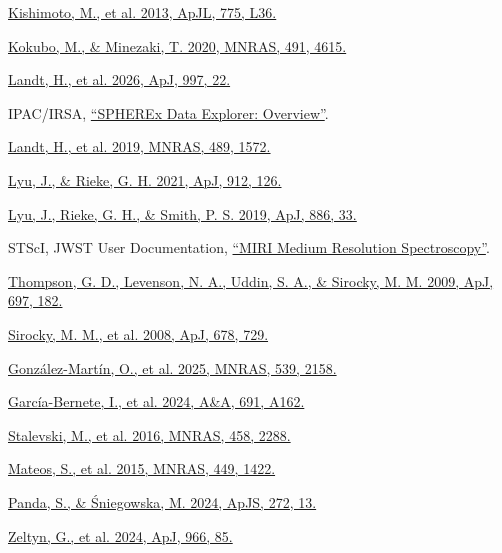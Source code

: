 \documentclass[12pt]{article}
\begin{document}
\noindent [18] \href{https://arxiv.org/abs/1308.6517}{Kishimoto, M., et al. 2013, ApJL, 775, L36.}\par
\noindent [19] \href{https://academic.oup.com/mnras/article/491/4/4615/5652205}{Kokubo, M., \& Minezaki, T. 2020, MNRAS, 491, 4615.}\par
\noindent [20] \href{https://arxiv.org/abs/2510.21395}{Landt, H., et al. 2026, ApJ, 997, 22.}\par
\noindent [21] IPAC/IRSA, \href{https://irsa.ipac.caltech.edu/onlinehelp/spherex/spherex/overview.html}{``SPHEREx Data Explorer: Overview''}.\par
\noindent [22] \href{https://arxiv.org/abs/1908.01627}{Landt, H., et al. 2019, MNRAS, 489, 1572.}\par
\noindent [23] \href{https://doi.org/10.3847/1538-4357/abee14}{Lyu, J., \& Rieke, G. H. 2021, ApJ, 912, 126.}\par
\noindent [24] \href{https://doi.org/10.3847/1538-4357/ab481d}{Lyu, J., Rieke, G. H., \& Smith, P. S. 2019, ApJ, 886, 33.}\par
\noindent [25] STScI, JWST User Documentation, \href{https://jwst-docs.stsci.edu/jwst-mid-infrared-instrument/miri-observing-modes/miri-medium-resolution-spectroscopy}{``MIRI Medium Resolution Spectroscopy''}.\par
\noindent [26] \href{https://doi.org/10.1088/0004-637X/697/1/182}{Thompson, G. D., Levenson, N. A., Uddin, S. A., \& Sirocky, M. M. 2009, ApJ, 697, 182.}\par
\noindent [27] \href{https://doi.org/10.1086/586727}{Sirocky, M. M., et al. 2008, ApJ, 678, 729.}\par
\noindent [28] \href{https://arxiv.org/abs/2504.01103}{Gonz\'alez-Mart\'in, O., et al. 2025, MNRAS, 539, 2158.}\par
\noindent [29] \href{https://doi.org/10.1051/0004-6361/202450086}{Garc\'ia-Bernete, I., et al. 2024, A\&A, 691, A162.}\par
\noindent [30] \href{https://doi.org/10.1093/mnras/stw444}{Stalevski, M., et al. 2016, MNRAS, 458, 2288.}\par
\noindent [31] \href{https://doi.org/10.1093/mnras/stv299}{Mateos, S., et al. 2015, MNRAS, 449, 1422.}\par
\noindent [32] \href{https://arxiv.org/abs/2206.10056}{Panda, S., \& \'Sniegowska, M. 2024, ApJS, 272, 13.}\par
\noindent [33] \href{https://arxiv.org/abs/2401.01933}{Zeltyn, G., et al. 2024, ApJ, 966, 85.}\par
\end{document}
